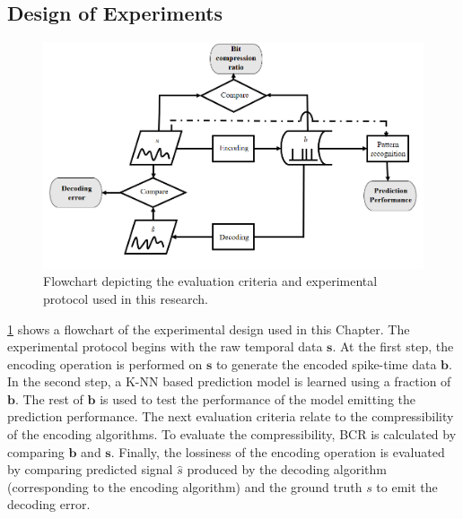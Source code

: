 \subsection{Design of Experiments}
\begin{figure}
	\centering
	\includegraphics[width=\linewidth]{fig/encoding/flowchart.png}
	\caption{Flowchart depicting the evaluation criteria and experimental protocol used in this research.}
	\label{fig:flowchart}
\end{figure}

\figurename \ref{fig:flowchart} shows a flowchart of the experimental design used in this Chapter. The experimental protocol begins with the raw temporal data $\mathbf{s}$. At the first step, the encoding operation is performed on $\mathbf{s}$ to generate the encoded spike-time data $\mathbf{b}$. In the second step, a K-NN based prediction model is learned using a fraction of $\mathbf{b}$. The rest of $\mathbf{b}$ is used to test the performance of the model emitting the prediction performance. The next evaluation criteria relate to the compressibility of the encoding algorithms. To evaluate the compressibility, BCR is calculated by comparing $\mathbf{b}$ and $\mathbf{s}$. Finally, the lossiness of the encoding operation is evaluated by comparing predicted signal $\hat{s}$ produced by the decoding algorithm (corresponding to the encoding algorithm) and the ground truth $s$ to emit the decoding error.   

